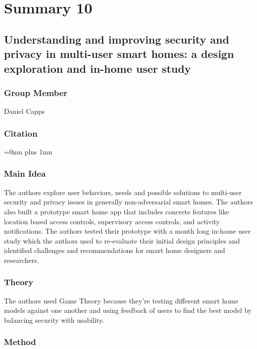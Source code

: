 \section{Summary 10}

\noindent
\subsection{{U}nderstanding and improving security and privacy in multi-user smart homes: a design exploration and in-home user study}

\subsubsection{Group Member}

\noindent
Daniel Capps

\noindent
\subsubsection{Citation}

\Urlmuskip=0mu plus 1mu\relax


\subsubsection{Main Idea}

\noindent
The authors explore user behaviors, needs and possible solutions to multi-user security and privacy issues in generally non-adversarial smart homes. The authors also built a prototype smart home app that includes concrete features like location based access controls, supervisory access controls, and activity notifications. The authors tested their prototype with a month long in-home user study which the authors used to re-evaluate their initial design principles and identified challenges and recommendations for smart home designers and researchers.

\subsubsection{Theory}

\noindent
The authors used Game Theory because they’re testing different smart home models against one another and using feedback of users to find the best model by balancing security with usability.

\subsubsection{Method}

